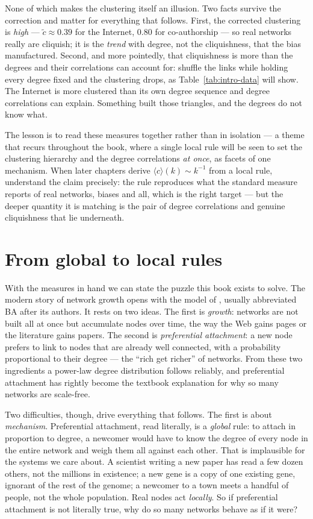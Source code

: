 None of which makes the clustering itself an illusion. Two facts survive the
correction and matter for everything that follows. First, the corrected clustering
is \emph{high} --- $\tilde c \approx 0.39$ for the Internet, $0.80$ for
co-authorship --- so real networks really are cliquish; it is the \emph{trend} with
degree, not the cliquishness, that the bias manufactured. Second, and more
pointedly, that cliquishness is more than the degrees and their correlations can
account for: shuffle the links while holding every degree fixed and the clustering
drops, as Table~\ref{tab:intro-data} will show. The Internet is more clustered than
its own degree sequence and degree correlations can explain. Something built those
triangles, and the degrees do not know what.

The lesson is to read these measures together rather than in isolation --- a theme
that recurs throughout the book, where a single local rule will be seen to set the
clustering hierarchy and the degree correlations \emph{at once}, as facets of one
mechanism. When later chapters derive $\langle c\rangle(k)\sim k^{-1}$ from a local
rule, understand the claim precisely: the rule reproduces what the standard measure
reports of real networks, biases and all, which is the right target --- but the
deeper quantity it is matching is the pair of degree correlations and genuine
cliquishness that lie underneath.

\section{From global to local rules}

With the measures in hand we can state the puzzle this book exists to solve. The
modern story of network growth opens with the model of \citet{barabasi1999},
usually abbreviated BA after its authors. It rests on two ideas. The first is
\emph{growth}: networks are not built all at once but accumulate nodes over time,
the way the Web gains pages or the literature gains papers. The second is
\emph{preferential attachment}: a new node prefers to link to nodes that are
already well connected, with a probability proportional to their degree --- the
``rich get richer'' of networks. From these two ingredients a power-law degree
distribution follows reliably, and preferential attachment has rightly become the
textbook explanation for why so many networks are scale-free.

Two difficulties, though, drive everything that follows. The first is about
\emph{mechanism}. Preferential attachment, read literally, is a \emph{global}
rule: to attach in proportion to degree, a newcomer would have to know the degree
of every node in the entire network and weigh them all against each other.
That is implausible for the systems we care about. A scientist writing a new
paper has read a few dozen others, not the millions in existence; a new gene is a
copy of one existing gene, ignorant of the rest of the genome; a newcomer to a
town meets a handful of people, not the whole population. Real nodes act
\emph{locally}. So if preferential attachment is not literally true, why do so
many networks behave as if it were?

